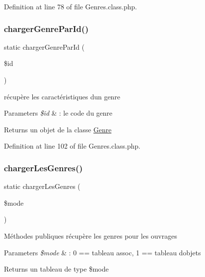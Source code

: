 Definition at line 78 of file Genres.\+class.\+php.

\mbox{\label{class_genres_add6e7378b07238ff72b2757add7e3003}} 
\subsubsection{\texorpdfstring{charger\+Genre\+Par\+Id()}{chargerGenreParId()}}
{\footnotesize\ttfamily static charger\+Genre\+Par\+Id (\begin{DoxyParamCaption}\item[{}]{\$id }\end{DoxyParamCaption})\hspace{0.3cm}{\ttfamily [static]}}

récupère les caractéristiques d\textquotesingle{}un genre 
\begin{DoxyParams}{Parameters}
{\em \$id} & \+: le code du genre \\
\hline
\end{DoxyParams}
\begin{DoxyReturn}{Returns}
un objet de la classe \hyperlink{class_genre}{Genre} 
\end{DoxyReturn}


Definition at line 102 of file Genres.\+class.\+php.

\mbox{\label{class_genres_a089e493cd2c6ff93bc14f25b403781ba}} 
\subsubsection{\texorpdfstring{charger\+Les\+Genres()}{chargerLesGenres()}}
{\footnotesize\ttfamily static charger\+Les\+Genres (\begin{DoxyParamCaption}\item[{}]{\$mode }\end{DoxyParamCaption})\hspace{0.3cm}{\ttfamily [static]}}

Méthodes publiques récupère les genres pour les ouvrages 
\begin{DoxyParams}{Parameters}
{\em \$mode} & \+: 0 == tableau assoc, 1 == tableau d\textquotesingle{}objets \\
\hline
\end{DoxyParams}
\begin{DoxyReturn}{Returns}
un tableau de type \$mode 
\end{DoxyReturn}



